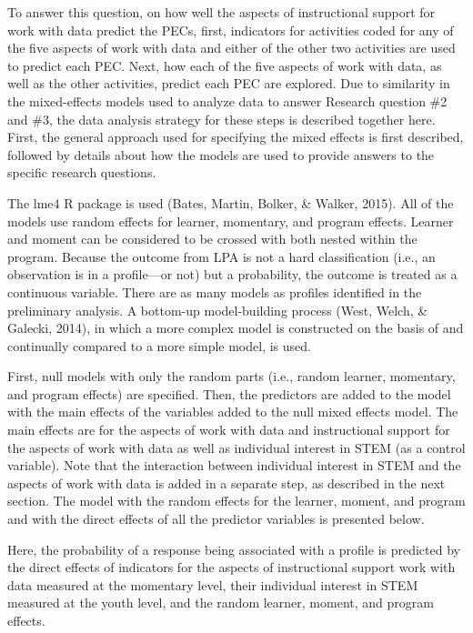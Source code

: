 \documentclass[]{book}
\theoremstyle{definition}
\theoremstyle{definition}
\theoremstyle{definition}
\theoremstyle{remark}
\begin{document}
To answer this question, on how well the aspects of instructional
support for work with data predict the PECs, first, indicators for
activities coded for any of the five aspects of work with data and
either of the other two activities are used to predict each PEC. Next,
how each of the five aspects of work with data, as well as the other
activities, predict each PEC are explored. Due to similarity in the
mixed-effects models used to analyze data to answer Research question
\#2 and \#3, the data analysis strategy for these steps is described
together here. First, the general approach used for specifying the mixed
effects is first described, followed by details about how the models are
used to provide answers to the specific research questions.

The lme4 R package is used (Bates, Martin, Bolker, \& Walker, 2015). All
of the models use random effects for learner, momentary, and program
effects. Learner and moment can be considered to be crossed with both
nested within the program. Because the outcome from LPA is not a hard
classification (i.e., an observation is in a profile---or not) but a
probability, the outcome is treated as a continuous variable. There are
as many models as profiles identified in the preliminary analysis. A
bottom-up model-building process (West, Welch, \& Galecki, 2014), in
which a more complex model is constructed on the basis of and
continually compared to a more simple model, is used.

First, null models with only the random parts (i.e., random learner,
momentary, and program effects) are specified. Then, the predictors are
added to the model with the main effects of the variables added to the
null mixed effects model. The main effects are for the aspects of work
with data and instructional support for the aspects of work with data as
well as individual interest in STEM (as a control variable). Note that
the interaction between individual interest in STEM and the aspects of
work with data is added in a separate step, as described in the next
section. The model with the random effects for the learner, moment, and
program and with the direct effects of all the predictor variables is
presented below.

Here, the probability of a response being associated with a profile is
predicted by the direct effects of indicators for the aspects of
instructional support work with data measured at the momentary level,
their individual interest in STEM measured at the youth level, and the
random learner, moment, and program effects.
\end{document}
